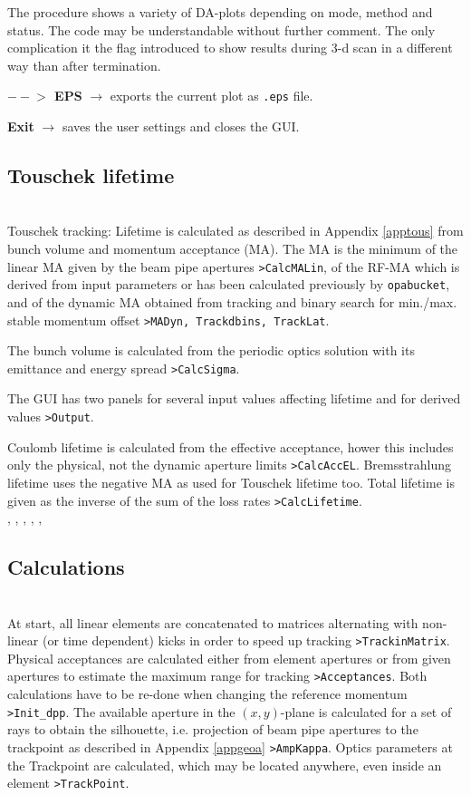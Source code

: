 \documentclass[12pt]{article}
\newcommand\code[1]{{\tt #1}}
\newcommand{\ofld}[1]{\colorbox{black!15}{{\bf #1}}}
\newcommand\guico[1]{{\color{blue}\code{#1}}}
\newcommand{\evcod}[2]{\ofld{#1} $\rightarrow$ \guico{#2}}
\newcommand{\opagui}[1]{\colorbox{blue!20}{{\color{black}\code{#1}}}}
\newcommand{\oguih}[2]{\subsection{\label{#2}#1}{\Huge\opagui{#2}}\\}
\newcommand{\opaguif}[1]{\colorbox{violet!30}{{\color{black}\code{#1}}}}
\newcommand{\oguif}[1]{\hyperref[#1]{\opaguif{#1}}}
\newcommand{\opauni}[1]{\colorbox{orange!30}{{\color{black}\code{#1}}}}
\newcommand{\ounih}[2]{\subsection{\label{#2}#1}{\Huge\opauni{#2}}\\}
\newcommand{\ouni}[1]{\hyperref[#1]{\opauni{#1}}}
\newcommand{\uses}[1]{\flushleft {\bf Uses:} #1}
\begin{document}
The \guico{MakePlot} procedure shows a variety of DA-plots depending on mode, method and status. The code may be understandable without further comment. The only complication it the flag \guico{MonitorXXP} introduced to show results during 3-d scan in a different way than after termination. 

\evcod{$--\!\!>$ EPS}{butExportClick} exports the current plot as \code{.eps} file.

\evcod{Exit}{Exit} saves the user settings and closes the GUI.





\oguih{Touschek lifetime}{opatracktt} 

Touschek tracking: Lifetime is calculated as described in Appendix \ref{apptous} from bunch volume and momentum acceptance (MA). The MA is the minimum of the linear MA given by the beam pipe apertures \code{>CalcMALin}, of the RF-MA which is derived from input parameters or has been calculated previously by {\tt opabucket}, and of the dynamic MA obtained from tracking and binary search for min./max. stable momentum offset \code{>MADyn, Trackdbins, TrackLat}.

The bunch volume is calculated from the periodic optics solution with its emittance and energy spread \code{>CalcSigma}.

The GUI has two panels for several input values affecting lifetime and for derived values \code{>Output}.

Coulomb lifetime is calculated from the effective acceptance, hower this includes only the physical, not the dynamic aperture limits \code{>CalcAccEL}. Bremsstrahlung lifetime uses the negative MA as used for Touschek lifetime too. Total lifetime is given as the inverse of the sum of the loss rates \code{>CalcLifetime}.\\



\uses{\ouni{tracklib}, \ouni{linoplib}, \ouni{globlib} \ouni{mathlib}, \oguif{../com/asfigure}, \ouni{../com/vgraph}, \ouni{../com/asaux}}


\ounih{Calculations}{tracklib}

At start, all linear elements are concatenated to matrices alternating with non-linear (or time dependent) kicks in order to speed up tracking \code{>TrackinMatrix}. Physical acceptances are calculated either from element apertures or from given apertures to estimate the maximum range for tracking \code{>Acceptances}. Both calculations have to be re-done when changing the reference momentum \code{>Init\_dpp}.
The available aperture in the $(x,y)$-plane is calculated for a set of rays to obtain the silhouette, i.e. projection of beam pipe apertures to the trackpoint as described in Appendix \ref{appgeoa} \code{>AmpKappa}. Optics parameters at the Trackpoint are calculated, which may be located anywhere, even inside an element \code{>TrackPoint}.
\end{document}
